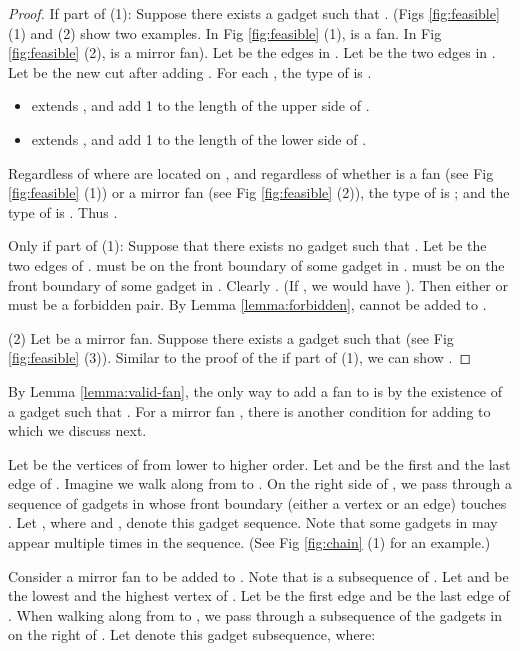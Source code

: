 \documentclass[11pt]{article}
\begin{document}
\begin{proof} If part of (1): Suppose there exists a gadget 
such that .
(Figs \ref{fig:feasible} (1) and (2) show two examples. In Fig
\ref{fig:feasible} (1),  is a fan. In Fig \ref{fig:feasible} (2),
 is a mirror fan). Let  be the edges in .
Let  be the two edges in . Let  be
the new cut after adding . For each , the type
of  is .

\begin{itemize}
\item  extends , and
add 1 to the length of the upper side of .
\item  extends , and
add 1 to the length of the lower side of .
\end{itemize}

Regardless of where  are located on , and regardless
of whether  is a fan (see Fig \ref{fig:feasible} (1)) or a mirror fan
(see Fig \ref{fig:feasible} (2)), the type of 
is ; and the type of  is .
Thus .

Only if part of (1): Suppose that there exists no gadget 
such that . Let  be the two
edges of .  must be on the front boundary
of some gadget  in .  must be on the front boundary of some
gadget  in . Clearly .
(If , we would have ).
Then either  or  must be a forbidden pair.
By Lemma \ref{lemma:forbidden},  cannot be added to .

(2) Let  be a mirror fan. Suppose there exists a gadget 
such that  (see Fig \ref{fig:feasible} (3)).
Similar to the proof of the if part of (1), we can show
.
\end{proof}

By Lemma \ref{lemma:valid-fan}, the only way to add a fan  to 
is by the existence of a gadget  such that . For a mirror fan , there is another
condition for adding  to  which we discuss next.

Let  be the vertices of  from lower
to higher order. Let  and  be the first and the last edge of .
Imagine we walk along  from  to . On the right
side of , we pass through a sequence of gadgets in  whose front
boundary (either a vertex or an edge) touches . Let
,
where  and ,
denote this gadget sequence. Note that some gadgets in
 may appear multiple times in the sequence.
(See Fig \ref{fig:chain} (1) for an example.)

Consider a mirror fan  to be added to . Note that 
is a subsequence of . Let  and  be the lowest and the highest vertex
of . Let  be the first edge and  be the last edge of . When walking
along  from  to , we pass through a subsequence
of the gadgets in  on the right of .
Let 
denote this gadget subsequence, where:
\end{document}
